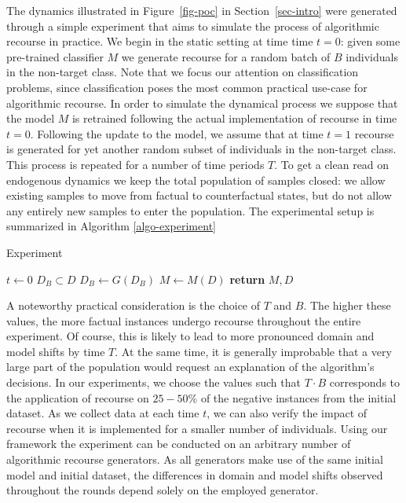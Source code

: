 \documentclass[
  conference]{IEEEtran}
\begin{document}
The dynamics illustrated in Figure~\ref{fig-poc} in
Section~\ref{sec-intro} were generated through a simple experiment that
aims to simulate the process of algorithmic recourse in practice. We
begin in the static setting at time time \(t=0\): given some pre-trained
classifier \(M\) we generate recourse for a random batch of \(B\)
individuals in the non-target class. Note that we focus our attention on
classification problems, since classification poses the most common
practical use-case for algorithmic recourse. In order to simulate the
dynamical process we suppose that the model \(M\) is retrained following
the actual implementation of recourse in time \(t=0\). Following the
update to the model, we assume that at time \(t=1\) recourse is
generated for yet another random subset of individuals in the non-target
class. This process is repeated for a number of time periods \(T\). To
get a clean read on endogenous dynamics we keep the total population of
samples closed: we allow existing samples to move from factual to
counterfactual states, but do not allow any entirely new samples to
enter the population. The experimental setup is summarized in Algorithm
\ref{algo-experiment}

\begin{algorithm}
\caption{Experiment}\label{algo-experiment}
\begin{algorithmic}[1]
\State $t\gets 0$
\State $D_B \subset D$
\State $D_B\gets G(D_B)$ 
\State $M\gets M(D)$ 
\EndWhile
\State \textbf{return} $M,D$
\EndProcedure
\end{algorithmic}
\end{algorithm}

A noteworthy practical consideration is the choice of \(T\) and \(B\).
The higher these values, the more factual instances undergo recourse
throughout the entire experiment. Of course, this is likely to lead to
more pronounced domain and model shifts by time \(T\). At the same time,
it is generally improbable that a very large part of the population
would request an explanation of the algorithm's decisions. In our
experiments, we choose the values such that \(T \cdot B\) corresponds to
the application of recourse on \(25-50\%\) of the negative instances
from the initial dataset. As we collect data at each time \(t\), we can
also verify the impact of recourse when it is implemented for a smaller
number of individuals. Using our framework the experiment can be
conducted on an arbitrary number of algorithmic recourse generators. As
all generators make use of the same initial model and initial dataset,
the differences in domain and model shifts observed throughout the
rounds depend solely on the employed generator.
\end{document}

